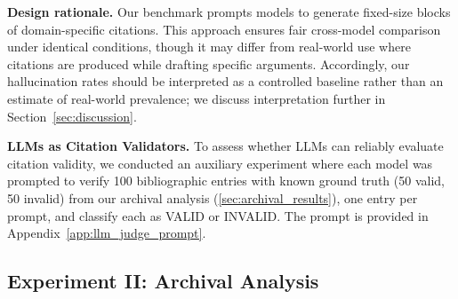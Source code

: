 \noindent\textbf{Design rationale.} Our benchmark prompts models to generate fixed-size blocks of domain-specific citations. This approach ensures fair cross-model comparison under identical conditions, though it may differ from real-world use where citations are produced while drafting specific arguments. Accordingly, our hallucination rates should be interpreted as a controlled baseline rather than an estimate of real-world prevalence; we discuss interpretation further in Section~\ref{sec:discussion}.

\noindent\textbf{LLMs as Citation Validators.}
To assess whether LLMs can reliably evaluate citation validity, we conducted an auxiliary experiment where each model was prompted to verify 100 bibliographic entries with known ground truth (50 valid, 50 invalid) from our archival analysis (\cref{sec:archival_results}), one entry per prompt, and classify each as VALID or INVALID. The prompt is provided in Appendix~\ref{app:llm_judge_prompt}.

\subsection{Experiment II: Archival Analysis}
\label{subsec:experiment_ii}

